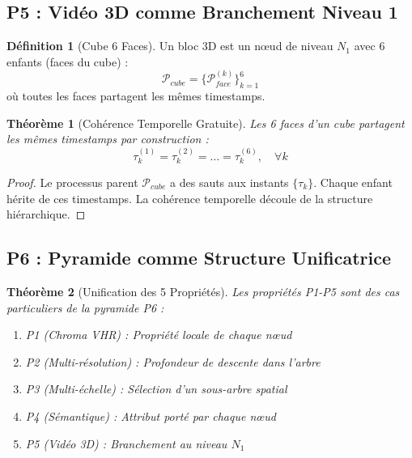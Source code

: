 \documentclass[12pt,a4paper]{article}
\newtheorem{theorem}{Théorème}[section]
\theoremstyle{definition}
\newtheorem{definition}{Définition}[section]
\begin{document}
	\subsection{P5 : Vidéo 3D comme Branchement Niveau 1}
	
	\begin{definition}[Cube 6 Faces]
		\label{def:cube_6_faces}
		Un bloc 3D est un nœud de niveau $N_1$ avec 6 enfants (faces du cube) :
		\begin{equation}
			\mathcal{P}_{cube} = \{\mathcal{P}_{face}^{(k)}\}_{k=1}^6
		\end{equation}
		où toutes les faces partagent les mêmes timestamps.
	\end{definition}
	
	\begin{theorem}[Cohérence Temporelle Gratuite]
		\label{thm:coherence_temporelle}
		Les 6 faces d'un cube partagent les mêmes timestamps par construction :
		\begin{equation}
			\tau_k^{(1)} = \tau_k^{(2)} = \dots = \tau_k^{(6)}, \quad \forall k
		\end{equation}
	\end{theorem}
	
	\begin{proof}
		Le processus parent $\mathcal{P}_{cube}$ a des sauts aux instants $\{\tau_k\}$. Chaque enfant hérite de ces timestamps. La cohérence temporelle découle de la structure hiérarchique.
	\end{proof}
	
	\subsection{P6 : Pyramide comme Structure Unificatrice}
	
	\begin{theorem}[Unification des 5 Propriétés]
		\label{thm:unification}
		Les propriétés P1-P5 sont des cas particuliers de la pyramide P6 :
		\begin{enumerate}
			\item P1 (Chroma VHR) : Propriété locale de chaque nœud
			\item P2 (Multi-résolution) : Profondeur de descente dans l'arbre
			\item P3 (Multi-échelle) : Sélection d'un sous-arbre spatial
			\item P4 (Sémantique) : Attribut porté par chaque nœud
			\item P5 (Vidéo 3D) : Branchement au niveau $N_1$
		\end{enumerate}
	\end{theorem}
	
\end{document}
